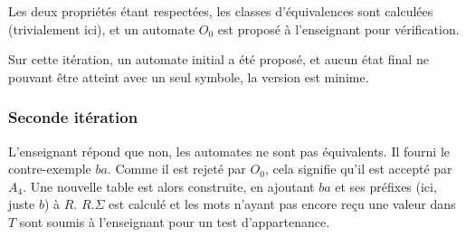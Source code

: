 Les deux propriétés étant respectées, les classes d'équivalences sont calculées (trivialement ici), et un automate $O_0$ est proposé à l'enseignant pour vérification.

Sur cette itération, un automate initial a été proposé, et aucun état final ne pouvant être atteint avec un seul symbole, la version est minime.

\subsubsection{Seconde itération}

L'enseignant répond que non, les automates ne sont pas équivalents. Il fourni le contre-exemple $ba$. Comme il est rejeté par $O_0$, cela signifie qu'il est accepté par $A_4$. Une nouvelle table est alors construite, en ajoutant $ba$ et ses préfixes (ici, juste $b$) à $R$. $R.\Sigma$ est calculé et les mots n'ayant pas encore reçu une valeur dans $T$ sont soumis à l'enseignant pour un test d'appartenance.
\vspace{1cm}

